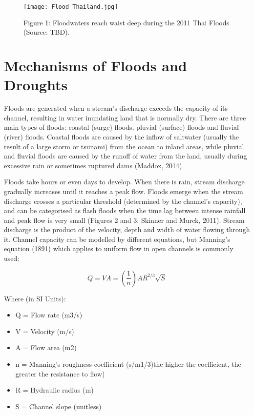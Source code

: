 \begin{figure}
	\centering
		\texttt{[image: Flood\_Thailand.jpg]}
	\caption{Figure 1: Floodwaters reach waist deep during the 2011 Thai Floods (Source: TBD).}
	\label{fig:Flood_Thailand}
\end{figure}


\section{Mechanisms of Floods and Droughts}

Floods are generated when a stream’s discharge exceeds the capacity of its channel, resulting in water inundating land that is normally dry. There are three main types of floods: coastal (surge) floods, pluvial (surface) floods and fluvial (river) floods. Coastal floods are caused by the inflow of saltwater (usually the result of a large storm or tsunami) from the ocean to inland areas, while pluvial and fluvial floods are caused by the runoff of water from the land, usually during excessive rain or sometimes ruptured dams (Maddox, 2014). 

Floods take hours or even days to develop. When there is rain, stream discharge gradually increases until it reaches a peak flow. Floods emerge when the stream discharge crosses a particular threshold (determined by the channel’s capacity), and can be categorised as flash floods when the time lag between intense rainfall and peak flow is very small (Figures 2 and 3; Skinner and Murck, 2011). Stream discharge is the product of the velocity, depth and width of water flowing through it. Channel capacity can be modelled by different equations, but Manning’s equation (1891) which applies to uniform flow in open channels is commonly used:

\begin{equation}
Q = VA = (\frac{1}{n})AR^{2/3}\sqrt{S}
\end{equation}
 
\noindent Where (in SI Units):

\begin{itemize}
	\item Q = Flow rate (m3/s)
	\item V = Velocity (m/s)
	\item A = Flow area (m2)
	\item n = Manning’s roughness coefficient (s/m1/3)the higher the coefficient, the greater the resistance to flow)
	\item R = Hydraulic radius (m)
	\item S = Channel slope (unitless)
\end{itemize}

